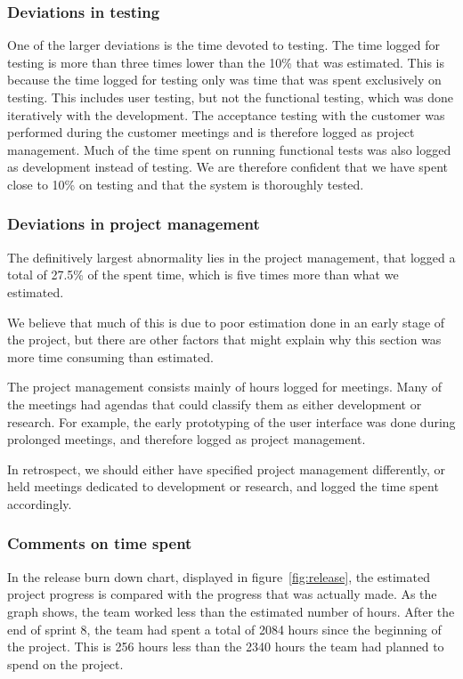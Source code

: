 \subsubsection{Deviations in testing}
One of the larger deviations is the time devoted to testing. The time logged for testing is more than three times lower than the 10\% that was estimated. This is because the time logged for testing only was time that was spent exclusively on testing. This includes user testing, but not the functional testing, which was done iteratively with the development. The acceptance testing with the customer was performed during the customer meetings and is therefore logged as project management. Much of the time spent on running functional tests was also logged as development instead of testing. We are therefore confident that we have spent close to 10\% on testing and that the system is thoroughly tested.

\subsubsection{Deviations in project management}
The definitively largest abnormality lies in the project management, that logged a total of 27.5\% of the spent time, which is five times more than what we estimated. 

We believe that much of this is due to poor estimation done in an early stage of the project, but there are other factors that might explain why this section was more time consuming than estimated.

The project management consists mainly of hours logged for meetings. Many of the meetings had agendas that could classify them as either development or research. For example, the early prototyping of the user interface was done during prolonged meetings, and therefore logged as project management. 

In retrospect, we should either have specified project management differently, or held meetings dedicated to development or research, and logged the time spent accordingly.

\subsubsection{Comments on time spent}
In the release burn down chart, displayed in figure~\ref{fig:release}, the estimated project progress is compared with the progress that was actually made. As the graph shows, the team worked less than the estimated number of hours. After the end of sprint 8, the team had spent a total of 2084 hours since the beginning of the project. This is 256 hours less than the 2340 hours the team had planned to spend on the project.

